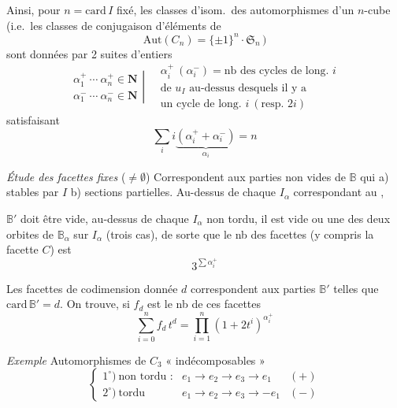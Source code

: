 \documentclass[11pt,a4paper]{article}
\begin{document}
Ainsi, pour $n = \mathrm{card}\, I$ fixé, les classes d'isom.\ des
automorphismes d'un $n$-cube (i.e.\ les classes de conjugaison d'éléments de
\[
  \mathrm{Aut}(C_n) = \lbrace \pm 1 \rbrace^n \cdot \mathfrak{S}_n\,)
\]
sont données par 2 suites d'entiers 
\[
  \left.
  \begin{array}{l}
    \alpha_1^+ \ \cdots\ \alpha_n^+ \in \mathbf{N} \\
    \alpha_1^- \ \cdots\ \alpha_n^- \in \mathbf{N}
  \end{array}
  \right| \quad
  \begin{array}{l}
    \alpha_i^+ \ (\alpha_i^-) = \text{nb des cycles de long.\ } i \\
    \text{de } u_I \text{ au-dessus desquels il y a} \\
    \text{un cycle de long.\ } i \ (\text{resp.\ } 2i)
  \end{array}
\]
satisfaisant
\[
  \sum_i i \underbrace{(\alpha_i^+ + \alpha_i^-)}_{\alpha_i} = n
\]

\emph{Étude des facettes fixes} ($\neq \emptyset$) \struck{\ill{}}
Correspondent aux parties non vides  de $\mathbb{B}$ qui
a) stables par $I$ b) sections partielles. Au-dessus de chaque $I_\alpha$
correspondant au  ,

$\mathbb{B}'$ doit être vide, au-dessus de chaque $I_\alpha$ non tordu, il
est vide ou une des deux orbites de $\mathbb{B}_\alpha$ sur $I_\alpha$
(trois cas), de sorte que le nb des  facettes
\struck{\ill{}} (y compris la facette $C$) \struck{\ill{}} est
\[
  3^{\sum \alpha_i^+}
\]

Les facettes de codimension donnée $d$ correspondent aux parties
$\mathbb{B}'$ telles que \struck{\ill{}} $\mathrm{card}\, \mathbb{B}' = d$.
On trouve, si $f_d$ est le nb de ces facettes
\[
  \boxed{\ \sum_{i=0}^n f_d\, t^d = \prod_{i=1}^n (1 + 2t^i)^{\alpha_i^+}\ }
\]

\emph{Exemple} Automorphismes de $C_3$
« indécomposables »
\[
  \left\lbrace
  \begin{array}{lll}
    1^\circ)\ \text{non tordu :} & e_1 \to e_2 \to e_3 \to e_1 & (+) \\
    2^\circ)\ \text{tordu} & e_1 \to e_2 \to e_3 \to -e_1 & (-)
  \end{array}
  \right.
\]
\end{document}

